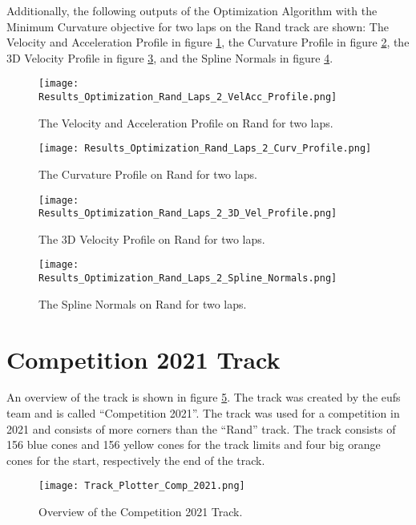 Additionally, the following outputs of the Optimization Algorithm with the Minimum Curvature objective for two laps on the Rand track are shown: The Velocity and Acceleration Profile in figure \ref{fig:Results Rand Laps 2 VelAcc Profile}, the Curvature Profile in figure \ref{fig:Results Rand Laps 2 Curv Profile}, the 3D Velocity Profile in figure \ref{fig:Results Rand Laps 2 3D Vel Profile}, and the Spline Normals in figure \ref{fig:Results Rand Laps 2 Spline Normals}.
\begin{figure}[H]
    \centering
    \texttt{[image: Results\_Optimization\_Rand\_Laps\_2\_VelAcc\_Profile.png]}
    \caption{The Velocity and Acceleration Profile on Rand for two laps.}
    \label{fig:Results Rand Laps 2 VelAcc Profile}
\end{figure}
\begin{figure}[H]
    \centering
    \texttt{[image: Results\_Optimization\_Rand\_Laps\_2\_Curv\_Profile.png]}
    \caption{The Curvature Profile on Rand for two laps.}
    \label{fig:Results Rand Laps 2 Curv Profile}
\end{figure}
\begin{figure}[H]
    \centering
    \texttt{[image: Results\_Optimization\_Rand\_Laps\_2\_3D\_Vel\_Profile.png]}
    \caption{The 3D Velocity Profile on Rand for two laps.}
    \label{fig:Results Rand Laps 2 3D Vel Profile}
\end{figure}
\begin{figure}[H]
    \centering
    \texttt{[image: Results\_Optimization\_Rand\_Laps\_2\_Spline\_Normals.png]}
    \caption{The Spline Normals on Rand for two laps.}
    \label{fig:Results Rand Laps 2 Spline Normals}
\end{figure}

\pagebreak

\section{Competition 2021 Track} \label{sec:Results Competition 2021 Track}
An overview of the track is shown in figure \ref{fig:Results Comp 2021 Initial}. The track was created by the \acrshort{eufs} team and is called ``Competition 2021''. \cite{eufs_sim_gitlab} The track was used for a competition in 2021 and consists of more corners than the ``Rand'' track. The track consists of 156 blue cones and 156 yellow cones for the track limits and four big orange cones for the start, respectively the end of the track.
\begin{figure}[H]
    \centering
    \texttt{[image: Track\_Plotter\_Comp\_2021.png]}
    \caption{Overview of the Competition 2021 Track.}
    \label{fig:Results Comp 2021 Initial}
\end{figure}

